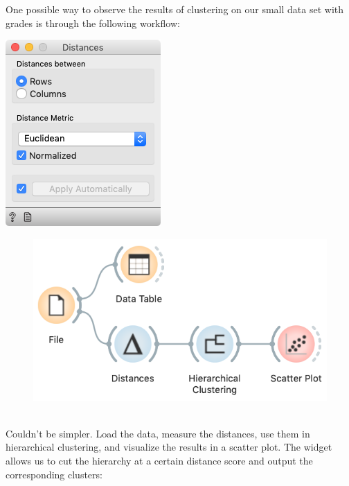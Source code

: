 \clearpage

One possible way to observe the results of clustering on our small data set with grades is through the following workflow:

\begin{marginfigure}
    \centering
    \includegraphics[scale=0.4]{graphics/ch-hierarchical_clustering/distances.png}
\end{marginfigure}

\begin{figure}[h]
    \centering
    \includegraphics[scale=0.4]{graphics/ch-hierarchical_clustering/workflow_clustering.png}
    \caption{$\;$} %
\end{figure}

Couldn’t be simpler. Load the data, measure the distances, use them in hierarchical clustering, and visualize the results in a scatter plot. The  widget allows us to cut the hierarchy at a certain distance score and output the corresponding clusters:

